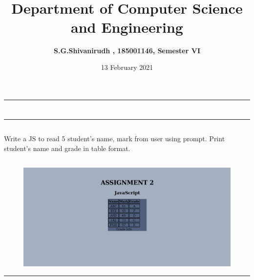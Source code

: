 \documentclass[12pt,letterpaper]{article}
\title{\textbf{Department of Computer Science and Engineering}}
\author{\textbf{S.G.Shivanirudh , 185001146, Semester VI }}
\date{13 February 2021}
\begin{document}
\maketitle
\hrule
\section*{}
\hrule 
\bigskip\bigskip

\subsection*{}

\subsection*{}
\begin{flushleft}
    Write a JS to read 5 student's name, mark from user using prompt.
    Print student's name and grade in table format.
\end{flushleft}

\subsection*{}
\subsubsection*{}
\begin{flushleft}

\end{flushleft}

\subsubsection*{}
\begin{flushleft}

\end{flushleft}

\subsubsection*{}
\begin{flushleft}

\end{flushleft}

\newpage
\subsection*{}
\begin{figure}[h]
    \centering
    \includegraphics[width = \textwidth]{OP.png}
\end{figure}
\hrule
\end{document}

